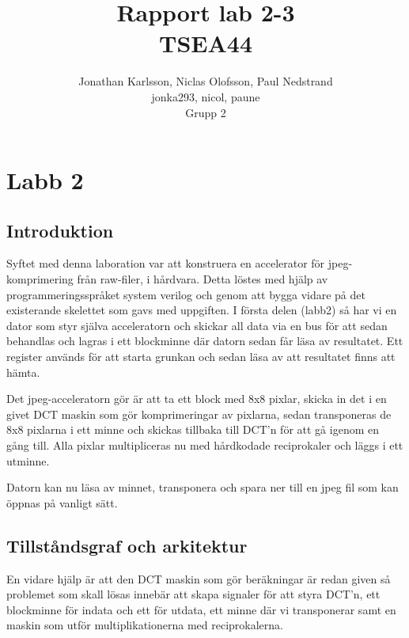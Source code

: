 \documentclass[a4paper]{article}
\author{Jonathan Karlsson, Niclas Olofsson, Paul Nedstrand\\jonka293, nicol, paune\\Grupp 2}
\title{Rapport lab 2-3\\ \vspace{2 mm} {\large TSEA44}}
\begin{document}
\maketitle

\newpage

\tableofcontents

\newpage
\section{Labb 2}
\subsection{Introduktion}
Syftet med denna laboration var att konstruera en accelerator för jpeg-komprimering från raw-filer, i hårdvara. Detta löstes med hjälp av programmeringsspråket system verilog och genom att bygga vidare på det existerande skelettet som gavs med uppgiften. I första delen (labb2) så har vi en dator som styr själva acceleratorn och skickar all data via en bus för att sedan behandlas och lagras i ett blockminne där datorn sedan får läsa av resultatet. Ett register används för att starta grunkan och sedan läsa av att resultatet finns att hämta.

Det jpeg-acceleratorn gör är att ta ett block med 8x8 pixlar, skicka in det i en givet DCT maskin som gör komprimeringar av pixlarna, sedan transponeras de 8x8 pixlarna i ett minne och skickas tillbaka till DCT\rq{}n för att gå igenom en gång till. Alla pixlar multipliceras nu med hårdkodade reciprokaler och läggs i ett utminne. 

Datorn kan nu läsa av minnet, transponera och spara ner till en jpeg fil som kan öppnas på vanligt sätt.

\subsection{Tillståndsgraf och arkitektur}
En vidare hjälp är att den DCT maskin som gör beräkningar är redan given så problemet som skall lösas innebär att skapa signaler för att styra DCT\rq{}n, ett blockminne för indata och ett för utdata, ett minne där vi transponerar samt en maskin som utför multiplikationerna med reciprokalerna.
\end{document}
